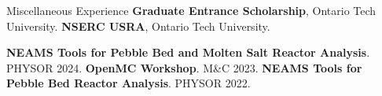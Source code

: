 \begin{rubric}{Miscellaneous Experience}
\entry*[2022] \textbf{Graduate Entrance Scholarship}, Ontario Tech University.
\entry*[2020, 2021] \textbf{NSERC USRA}, Ontario Tech University.

\entry*[2023] \textbf{NEAMS Tools for Pebble Bed and Molten Salt Reactor Analysis}. PHYSOR 2024.
\entry*[2023] \textbf{OpenMC Workshop}. M\&C 2023.
\entry*[2022] \textbf{NEAMS Tools for Pebble Bed Reactor Analysis}. PHYSOR 2022.

\end{rubric}
